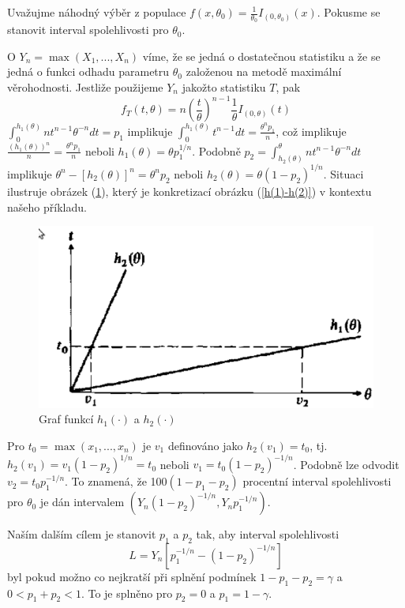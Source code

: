 \begin{example}
Uvažujme náhodný výběr z populace $f(x, \theta_0) = \frac{1}{\theta_0}I_{(0, \theta_0)}(x)$. Pokusme se stanovit interval spolehlivosti pro $\theta_0$.

O $Y_n = \max(X_1, ..., X_n)$ víme, že se jedná o dostatečnou statistiku a že se jedná o funkci odhadu parametru $\theta_0$ založenou na metodě maximální věrohodnosti. Jestliže použijeme $Y_n$ jakožto statistiku $T$, pak
\begin{equation*}
f_T(t, \theta) = n \left(\frac{t}{\theta}\right)^{n - 1}\frac{1}{\theta}I_{(0, \theta)}(t)
\end{equation*}
$\int_0^{h_1(\theta)}n t^{n - 1}\theta^{-n}dt = p_1$ implikuje $\int_0^{h_1(\theta)}t^{n - 1}dt = \frac{\theta^n p_1}{n}$, což implikuje $\frac{\left(h_1(\theta) \right)^n}{n} = \frac{\theta^n p_1}{n}$ neboli $h_1(\theta) = \theta p_1^{1/n}$. Podobně $p_2 = \int_{h_2(\theta)}^{\theta}nt^{n - 1}\theta^{-n}dt$ implikuje $\theta^n - [h_2(\theta)]^n = \theta^n p_2$ neboli $h_2(\theta) = \theta(1 - p_2)^{1/n}$. Situaci ilustruje obrázek (\ref{h(1)-h(2)-example}), který je konkretizací obrázku (\ref{h(1)-h(2)}) v kontextu našeho příkladu.
\begin{figure}[htp]
\centering
\includegraphics[scale = 0.5]{pictures/h(1)_h(2)_example.eps}
\caption{Graf funkcí $h_1(\cdot)$ a $h_2(\cdot)$}
\label{h(1)-h(2)-example}
\end{figure}
Pro $t_0 = \max(x_1, ..., x_n)$ je $v_1$ definováno jako $h_2(v_1) = t_0$, tj. $h_2(v_1) = v_1(1 - p_2)^{1/n} = t_0$ neboli $v_1 = t_0(1 - p_2)^{-1/n}$. Podobně lze odvodit $v_2 = t_0 p_1^{-1/n}$. To znamená, že 100$(1 - p_1 - p_2)$ procentní interval spolehlivosti pro $\theta_0$ je dán intervalem $(Y_n(1 - p_2)^{-1/n}, Y_n p_1^{-1/n})$.

Naším dalším cílem je stanovit $p_1$ a $p_2$ tak, aby interval spolehlivosti
\begin{equation*}
L = Y_n[p_1^{-1/n} - (1 - p_2)^{-1/n}]
\end{equation*}
byl pokud možno co nejkratší při splnění podmínek $1 - p_1 - p_2 = \gamma$ a $0 < p_1 + p_2 < 1$. To je splněno pro $p_2 = 0$ a $p_1 = 1 - \gamma$.
\end{example}

